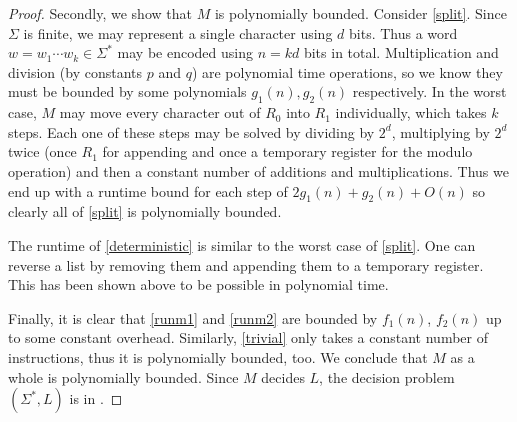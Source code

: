 \documentclass{article}
\begin{document}
\begin{claim*}[c]
\begin{proof}
        Secondly, we show that $M$ is polynomially bounded. Consider \ref{split}. Since $\Sigma$ is finite, we may 
        represent a single character using 
        $d$ bits. Thus a word $w=w_1\cdots w_k \in\Sigma^*$ may be encoded using $n=kd$ bits in total.
        Multiplication and division (by constants $p$ and $q$) are polynomial time operations, so we know
        they must be bounded by some polynomials $g_1(n),g_2(n)$ respectively. In the worst case, $M$ may move
        every character out of $R_0$ into $R_1$ individually, which takes $k$ steps. Each one of these steps 
        may be solved by dividing by $2^d$, multiplying by $2^d$ twice (once $R_1$ for appending and once a
        temporary register for the modulo operation) and then a constant number of additions and multiplications.
        Thus we end up with a runtime bound for each step of $2g_1(n)+g_2(n)+O(n)$ so clearly all of \ref{split}
        is polynomially bounded.

        The runtime of \ref{deterministic} is similar to the worst case of \ref{split}. One can reverse a list 
        by removing them and appending them to a temporary register. This has been shown above to be possible in 
        polynomial time.

        Finally, it is clear that \ref{runm1} and \ref{runm2} are bounded by $f_1(n)$, $f_2(n)$ up to some 
        constant overhead. Similarly, \ref{trivial} only takes a constant number of instructions, thus it is polynomially bounded, too. 
        We conclude that $M$ as a whole is polynomially bounded. Since $M$ decides $L$, the decision problem 
        $(\Sigma^*, L)$ is in \nptime.
    \end{proof}
\end{claim*}
\end{document}
